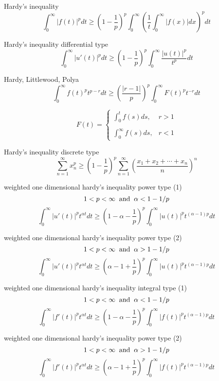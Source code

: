Hardy's inequality
$$
\int^\infty_0|f(t)|^p dt \ge\left(1-\frac{1}{p}\right)^p\int^\infty_0\left(\frac{1}{t}\int^\infty_0|f(x)|dx\right)^p dt
$$

Hardy's inequality differential type
$$
\int^\infty_0|u'(t)|^p dt \ge \left(1-\frac{1}{p}\right)^p\int^\infty_0\frac{|u(t)|^p}{t^p}dt
$$

Hardy, Littlewood, Polya
$$
\int^\infty_0f(t)^pt^{p-r} dt\ge \left(\frac{|r-1|}{p}\right)^p\int^\infty_0F(t)^pt^{-r}dt
$$

$$
F(t)=
\left\{
\begin{array}{ll}
\int^t_0 f(s)ds, & r>1 \\
\\
\int^\infty_0 f(s)ds, & r<1
\end{array}
\right.
$$

Hardy's inequality discrete type
$$
\sum^\infty_{n=1} x^p_n \ge \left(1-\frac{1}{p}\right)^p\sum^\infty_{n=1}\left(\frac{x_1+x_2+\cdots+x_n}{n}\right)^n
$$

weighted one dimensional hardy's inequality power type (1)
$$
1< p <\infty \;\; {\rm and} \;\; \alpha< 1-1/p
$$
$$
\int^\infty_0\left |u'(t)\right|^p t^{\alpha t}dt \ge \left(1-\alpha-\frac{1}{p}\right)^p\int^\infty_0 \left |u(t)\right|^p t^{(\alpha-1)p}dt
$$

weighted one dimensional hardy's inequality power type (2)
$$
1< p <\infty \;\; {\rm and} \;\; \alpha> 1-1/p
$$
$$
\int^\infty_0\left |u'(t)\right|^p t^{\alpha t}dt \ge \left(\alpha-1+\frac{1}{p}\right)^p\int^\infty_0 \left |u(t)\right|^p t^{(\alpha-1)p}dt
$$

weighted one dimensional hardy's inequality integral type (1)
$$
1< p <\infty \;\; {\rm and} \;\; \alpha< 1-1/p
$$
$$
\int^\infty_0\left |f'(t)\right|^p t^{\alpha t}dt \ge \left(1-\alpha-\frac{1}{p}\right)^p\int^\infty_0 \left |f(t)\right|^p t^{(\alpha-1)p}dt
$$

weighted one dimensional hardy's inequality power type (2)
$$
1< p <\infty \;\; {\rm and} \;\; \alpha> 1-1/p
$$
$$
\int^\infty_0\left |f'(t)\right|^p t^{\alpha t}dt \ge \left(\alpha-1+\frac{1}{p}\right)^p\int^\infty_0 \left |f(t)\right|^p t^{(\alpha-1)p}dt
$$
